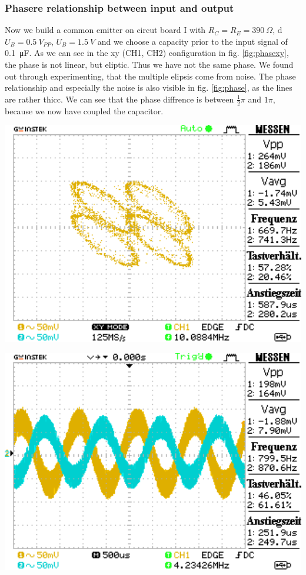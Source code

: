 \documentclass[a4paper,10pt]{article}
\newenvironment{Figure}
  {\par\medskip\noindent\minipage{\linewidth}}
  {\endminipage\par\medskip} %
\numberwithin{equation}{section}
\begin{document}
\begin{multicols}{2}
	\subsubsection*{Phasere relationship between input and output}
	Now we build a common emitter on circut board I with $R_C=R_E=\SI{390}{\Omega}$, d$U_B=\SI{0.5}{V_{PP}}$, $U_B=\SI{1.5}{V}$ and we choose a capacity prior to the input signal of \SI{0.1}{\micro F}. As we can see in the xy (CH1, CH2) configuration in fig. \ref{fig:phasexy}, the phase is not linear, but eliptic. Thus we have not the same phase. We found out through experimenting, that the multiple elipsis come from noise. The phase relationship and especially the noise is also visible in fig. \ref{fig:phase}, as the lines are rather thicc. We can see that the phase diffrence is between $\frac{1}{2}\pi$ and $1\pi$, because we now have coupled the capacitor.
	\begin{Figure}
		\centering
		\includegraphics[width=1\textwidth]{../data/DS0020.png}
		\label{fig:phasexy}
	\end{Figure}
	\begin{Figure}
		\centering
		\includegraphics[width=1\textwidth]{../data/DS0021.png}
		\label{fig:phase}
	\end{Figure}

\end{multicols}
\end{document}
